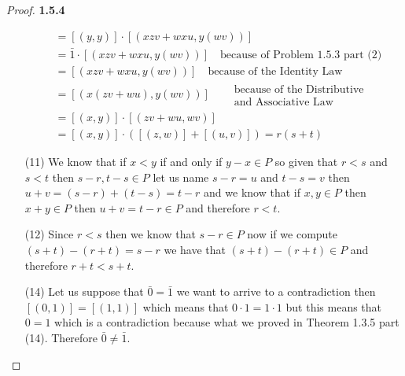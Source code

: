 \documentclass[11pt]{article}
\theoremstyle{definition}
\begin{document}
\begin{proof}{\textbf{1.5.4}}
\begin{itemize}
\begin{align*}
                &= [(y,y)]\cdot[(xzv + wxu, y(wv))]\\
                &= \bar{1} \cdot[(xzv + wxu, y(wv))] \quad \text{because of Problem 1.5.3 part (2)}\\
                &= [(xzv + wxu, y(wv))] \quad \text{because of the Identity Law}\\
                &= [(x(zv+wu),y(wv))] \quad \begin{aligned} &\text{because of the Distributive}\\
                                                            &\text{and Associative Law}\end{aligned}\\
                &= [(x,y)]\cdot[(zv+wu,wv)]\\
                &= [(x,y)]\cdot([(z,w)]+[(u,v)]) = r(s+t)
        \end{align*}
        \item [(11)]
        We know that if $x<y$ if and only if $y-x \in P$ so given that $r<s$ and $s<t$
        then $s-r, t-s \in P$ let us name $s-r = u$ and $t-s = v$ then
        $u+v = (s-r) + (t-s) = t-r$ and we know that if $x,y \in P$ then $x+y \in P$
        then $u+v = t-r \in P$ and therefore $r<t$.
        \item [(12)]
        Since $r<s$ then we know that $s-r \in P$ now if we compute $(s+t)-(r+t)=s-r$
        we have that $(s+t)-(r+t) \in P$ and therefore $r+t<s+t$.
        \item [(14)]
        Let us suppose that $\bar{0} = \bar{1}$ we want to arrive to a contradiction
        then $[(0,1)] = [(1,1)]$ which means that $0\cdot 1 = 1 \cdot 1$ but this means
        that $0 = 1$ which is a contradiction because what we proved in Theorem 1.3.5
        part (14). Therefore $\bar{0} \neq \bar{1}$.
        \end{itemize}
    \end{proof}
\end{document}
